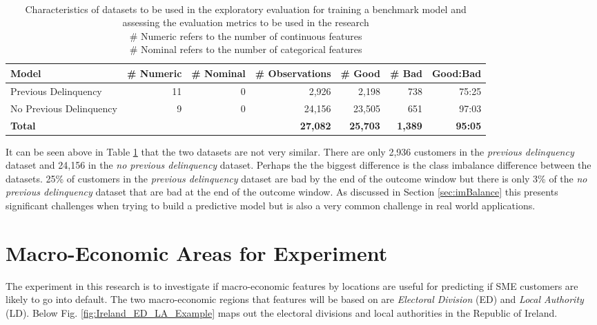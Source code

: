 \begin{table}[H]
	\centering\
	\resizebox{\textwidth}{!}
	{
		\begin{tabular}{l r r r r r r}
			\hline
			\textbf{Model} &  \textbf{\# Numeric} & \textbf{\# Nominal} & \textbf{\# Observations} & \textbf{\# Good} & \textbf{\# Bad} & \textbf{Good:Bad}\\
			\hline
			Previous Delinquency & 11 & 0 & 2,926 & 2,198  & 738 & 75:25 \\ 
			No Previous Delinquency & 9 & 0 & 24,156 & 23,505 & 651  & 97:03 \\ \hline
			\textbf{Total} &  &  & \textbf{27,082} & \textbf{25,703} & \textbf{1,389} & \textbf{95:05} \\ \hline
		\end{tabular}
	}
	\caption{Characteristics of datasets to be used in the exploratory evaluation for training a benchmark model and assessing the evaluation metrics to be used in the research \\
		 \# Numeric refers to the number of continuous features \\
		 \# Nominal refers to the number of categorical features
		}
	\label{characteristicsDatasets}
\end{table}

It can be seen above in Table \ref{characteristicsDatasets} that the two datasets are not very similar. There are only 2,936 customers in the \textit{previous delinquency} dataset and 24,156 in the \textit{no previous delinquency} dataset. Perhaps the the biggest difference is the class imbalance difference between the datasets. 25\% of customers in the \textit{previous delinquency} dataset are bad by the end of the outcome window but there is only 3\% of the \textit{no previous delinquency} dataset that are bad at the end of the outcome window. As discussed in Section \ref{sec:imBalance} this presents significant challenges when trying to build a predictive model but is also a very common challenge in real world applications. 


\section{Macro-Economic Areas for Experiment}
The experiment in this research is to investigate if macro-economic features by locations are useful for predicting if SME customers are likely to go into default. The two macro-economic regions that features will be based on are \textit{Electoral Division} (ED) and \textit{Local Authority} (LD). Below Fig. \ref{fig:Ireland_ED_LA_Example} maps out the electoral divisions and local authorities in the Republic of Ireland.

